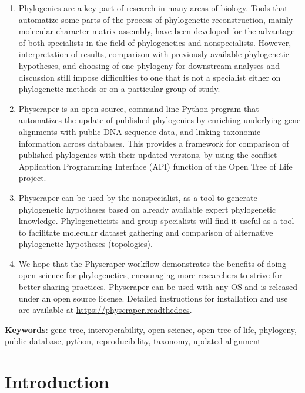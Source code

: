 \documentclass[]{article}
\begin{document}
\begin{enumerate}
\def\labelenumi{\arabic{enumi}.}
\item
  Phylogenies are a key part of research in many areas of biology. Tools that automatize
  some parts of the process of phylogenetic reconstruction, mainly molecular character matrix assembly,
  have been developed for the advantage of both specialists in the field of phylogenetics and nonspecialists.
  However, interpretation of results, comparison with previously available phylogenetic
  hypotheses, and choosing of one phylogeny for downstream analyses and discussion still impose difficulties
  to one that is not a specialist either on phylogenetic methods or on a particular group of study.
\item
  Physcraper is an open‐source, command-line Python program that automatizes the update of published
  phylogenies by enriching underlying gene alignments with public DNA sequence data, and linking taxonomic information across databases.
  This provides a framework for comparison of published phylogenies with their updated versions, by using the conflict Application Programming Interface (API) function of the Open Tree of Life project.
\item
  Physcraper can be used by the nonspecialist, as a tool to generate phylogenetic
  hypotheses based on already available expert phylogenetic knowledge.
  Phylogeneticists and group specialists will find it useful as a tool to facilitate molecular dataset gathering and comparison
  of alternative phylogenetic hypotheses (topologies).
\item
  We hope that the Physcraper workflow demonstrates the benefits of doing open science for phylogenetics, encouraging more researchers to strive for better sharing practices. Physcraper can be used with any OS and is released under an open source license. Detailed instructions for installation and
  use are available at \href{https://physcraper.readthedocs.io/en/tutorial/index.html}{https://physcraper.readthedocs}.
\end{enumerate}

\textbf{Keywords}: gene tree, interoperability, open science, open tree of life, phylogeny, public database, python, reproducibility, taxonomy, updated alignment

\newpage

\hypertarget{introduction}{%
\section{Introduction}\label{introduction}}
\end{document}
